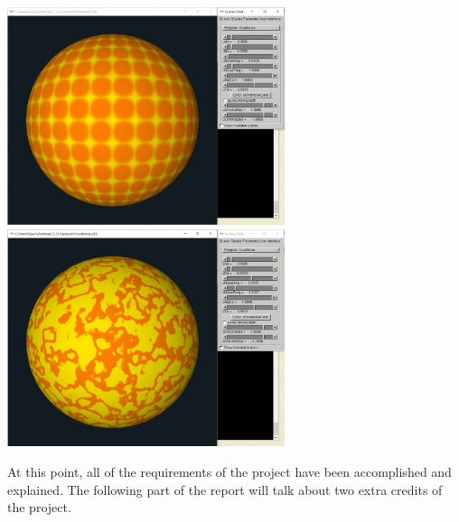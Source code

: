 \documentclass[letterpaper,14pt,titlepage,fleqn]{article}
\begin{document}
\begin{center}
	\includegraphics[width=3.2in]{T1.jpg}
	\includegraphics*[width=3.2in]{T2.jpg}
\end{center}
At this point, all of the requirements of the project have been accomplished and explained. The following part of the report will talk about two extra credits of the project.
\end{document}
